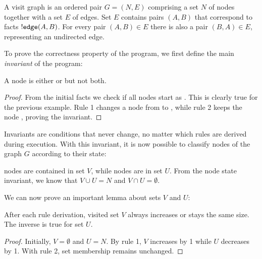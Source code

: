 \begin{definition}
A visit graph is an ordered pair $G = (N, E)$ comprising a set $N$ of nodes together
with a set $E$ of edges. Set $E$ contains pairs $(A, B)$ that correspond to
facts ${!} \mathtt{edge}(A, B)$. For every pair $(A, B) \in E$ there is also a
pair $(B, A) \in E$, representing an undirected edge.
\end{definition}

To prove the correctness property of the program, we first define the main
\emph{invariant} of the program:

\begin{invariant}
A node is either  or  but not both.
\end{invariant}

\begin{proof}

From the initial facts we check if all nodes start as . This is
clearly true for the previous example. Rule 1 changes a node from
 to , while rule 2 keeps the node ,
proving the invariant.

\end{proof}

Invariants are conditions that never change, no matter which rules are derived
during execution. With this invariant, it is now possible to classify nodes of
the graph $G$ according to their state:

\begin{definition}  nodes are contained in set $V$,
while  nodes are in set $U$. From the node state invariant, we
know that $V \cup U = N$ and $V \cap U = \emptyset$.
\end{definition}

We can now prove an important lemma about sets $V$ and $U$:

\begin{invariant}

After each rule derivation, visited set $V$ always increases or stays the same
size. The inverse is true for set $U$.

\end{invariant}
\begin{proof}
Initially, $V = \emptyset$ and $U = N$.
By rule 1, $V$ increases by 1 while $U$ decreases by 1. With rule 2, set
membership remains unchanged.
\end{proof}


